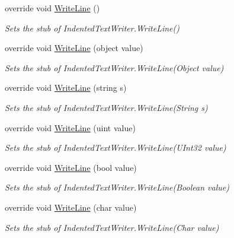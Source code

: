 \begin{DoxyCompactItemize}
override void \hyperlink{class_system_1_1_code_dom_1_1_compiler_1_1_fakes_1_1_stub_indented_text_writer_a1376fc334331d519f36bb3d3f9522b78}{Write\-Line} ()
\begin{DoxyCompactList}\small\item\em Sets the stub of Indented\-Text\-Writer.\-Write\-Line()\end{DoxyCompactList}\item 
override void \hyperlink{class_system_1_1_code_dom_1_1_compiler_1_1_fakes_1_1_stub_indented_text_writer_a0ce51adcd0c77056e23bb2da3624a58d}{Write\-Line} (object value)
\begin{DoxyCompactList}\small\item\em Sets the stub of Indented\-Text\-Writer.\-Write\-Line(\-Object value)\end{DoxyCompactList}\item 
override void \hyperlink{class_system_1_1_code_dom_1_1_compiler_1_1_fakes_1_1_stub_indented_text_writer_a96cb02ddba4824af46a3dfe800b525b3}{Write\-Line} (string s)
\begin{DoxyCompactList}\small\item\em Sets the stub of Indented\-Text\-Writer.\-Write\-Line(\-String s)\end{DoxyCompactList}\item 
override void \hyperlink{class_system_1_1_code_dom_1_1_compiler_1_1_fakes_1_1_stub_indented_text_writer_aca3ba23406026ba28af2325092025d20}{Write\-Line} (uint value)
\begin{DoxyCompactList}\small\item\em Sets the stub of Indented\-Text\-Writer.\-Write\-Line(\-U\-Int32 value)\end{DoxyCompactList}\item 
override void \hyperlink{class_system_1_1_code_dom_1_1_compiler_1_1_fakes_1_1_stub_indented_text_writer_aa6df6c597a81b97de38b073deedc08e8}{Write\-Line} (bool value)
\begin{DoxyCompactList}\small\item\em Sets the stub of Indented\-Text\-Writer.\-Write\-Line(\-Boolean value)\end{DoxyCompactList}\item 
override void \hyperlink{class_system_1_1_code_dom_1_1_compiler_1_1_fakes_1_1_stub_indented_text_writer_ad80d70d981785f78fb81ac847f94b99f}{Write\-Line} (char value)
\begin{DoxyCompactList}\small\item\em Sets the stub of Indented\-Text\-Writer.\-Write\-Line(\-Char value)\end{DoxyCompactList}\item 

\end{DoxyCompactItemize}
